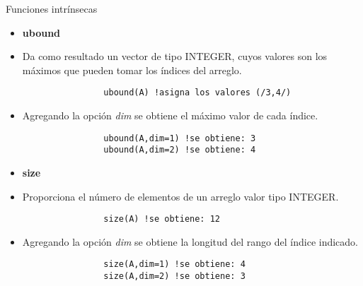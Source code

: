 \begin{frame}[fragile]{Funciones intrínsecas} 
    \begin{itemize}[<+(0)->]
        \item [] \textbf{ubound} 
        \item Da como resultado un vector de tipo INTEGER, cuyos valores son los máximos que pueden tomar los índices del arreglo.
             \vspace{0.1cm}
            \begin{verbatim}
                ubound(A) !asigna los valores (/3,4/)
            \end{verbatim}
        \item [] Agregando la opción \emph{dim} se obtiene el máximo valor de cada índice.
            \vspace{0.1cm}
            \begin{verbatim}
                ubound(A,dim=1) !se obtiene: 3
                ubound(A,dim=2) !se obtiene: 4
            \end{verbatim}
        \item [] \textbf{size} 
        \item Proporciona el número de elementos de un arreglo valor tipo INTEGER.
            \vspace{0.1cm}
            \begin{verbatim}
                size(A) !se obtiene: 12
            \end{verbatim}
        \item [] Agregando la opción \emph{dim} se obtiene la longitud del rango del índice indicado.
             \vspace{0.1cm}
            \begin{verbatim}
                size(A,dim=1) !se obtiene: 4
                size(A,dim=2) !se obtiene: 3
            \end{verbatim}
    \end{itemize}
\end{frame}


